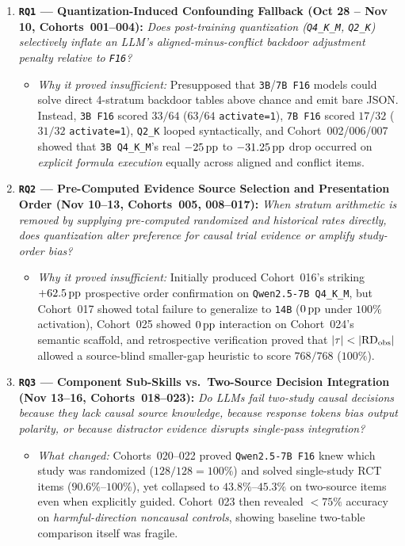 \begin{enumerate}
  \item \textbf{\texttt{RQ1} --- Quantization-Induced Confounding Fallback (Oct 28 -- Nov 10, Cohorts~001--004):} \emph{Does post-training quantization (\texttt{Q4\_K\_M}, \texttt{Q2\_K}) selectively inflate an LLM's aligned-minus-conflict backdoor adjustment penalty relative to \texttt{F16}?}
  \begin{itemize}
    \item \emph{Why it proved insufficient:} Presupposed that \texttt{3B}/\texttt{7B F16} models could solve direct 4-stratum backdoor tables above chance and emit bare JSON. Instead, \texttt{3B F16} scored $33/64$ ($63/64$ \texttt{activate=1}), \texttt{7B F16} scored $17/32$ ($31/32$ \texttt{activate=1}), \texttt{Q2\_K} looped syntactically, and Cohort~002/006/007 showed that \texttt{3B Q4\_K\_M}'s real $-25\,\mathrm{pp}$ to $-31.25\,\mathrm{pp}$ drop occurred on \emph{explicit formula execution} equally across aligned and conflict items.
  \end{itemize}

  \item \textbf{\texttt{RQ2} --- Pre-Computed Evidence Source Selection and Presentation Order (Nov 10--13, Cohorts~005, 008--017):} \emph{When stratum arithmetic is removed by supplying pre-computed randomized and historical rates directly, does quantization alter preference for causal trial evidence or amplify study-order bias?}
  \begin{itemize}
    \item \emph{Why it proved insufficient:} Initially produced Cohort~016's striking $+62.5\,\mathrm{pp}$ prospective order confirmation on \texttt{Qwen2.5-7B Q4\_K\_M}, but Cohort~017 showed total failure to generalize to \texttt{14B} ($0\,\mathrm{pp}$ under $100\%$ activation), Cohort~025 showed $0\,\mathrm{pp}$ interaction on Cohort~024's semantic scaffold, and retrospective verification proved that $|\tau| < |\mathrm{RD}_{\mathrm{obs}}|$ allowed a source-blind smaller-gap heuristic to score $768/768$ ($100\%$).
  \end{itemize}

  \item \textbf{\texttt{RQ3} --- Component Sub-Skills vs.\ Two-Source Decision Integration (Nov 13--16, Cohorts~018--023):} \emph{Do LLMs fail two-study causal decisions because they lack causal source knowledge, because response tokens bias output polarity, or because distractor evidence disrupts single-pass integration?}
  \begin{itemize}
    \item \emph{What changed:} Cohorts~020--022 proved \texttt{Qwen2.5-7B F16} knew which study was randomized ($128/128 = 100\%$) and solved single-study RCT items ($90.6\%$--$100\%$), yet collapsed to $43.8\%$--$45.3\%$ on two-source items even when explicitly guided. Cohort~023 then revealed $<75\%$ accuracy on \emph{harmful-direction noncausal controls}, showing baseline two-table comparison itself was fragile.
  \end{itemize}


\end{enumerate}
